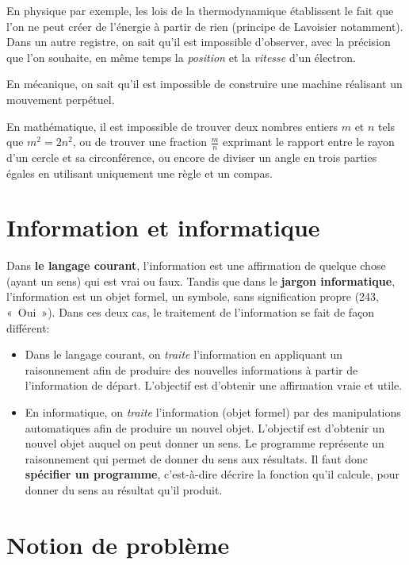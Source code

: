 En physique par exemple, les lois de la thermodynamique établissent le fait que l'on ne peut créer de l'énergie à partir de rien (principe de Lavoisier notamment). Dans un autre registre, on sait qu'il est impossible d'observer, avec la précision que l'on souhaite, en même temps la \textit{position} et la \textit{vitesse} d'un électron.

En mécanique, on sait qu'il est impossible de construire une machine réalisant un mouvement perpétuel.

En mathématique, il est impossible de trouver deux nombres entiers $m$ et $n$ tels que $m^2 = 2n^2$, ou de trouver une fraction $\frac{m}{n}$ exprimant le rapport entre le rayon d'un cercle et sa circonférence, ou encore de diviser un angle en trois parties égales en utilisant uniquement une règle et un compas.

\section{Information et informatique}
\label{sec:information_informatique}

Dans \textbf{le langage courant}, l’information est une affirmation de quelque chose (ayant un sens) qui est vrai ou faux. Tandis que dans le \textbf{jargon informatique}, l’information est un objet formel, un symbole, sans signification propre (243, « Oui »).
Dans ces deux cas, le traitement de l'information se fait de façon différent:
\begin{itemize}
	\item Dans le langage courant, on \textit{traite} l'information en appliquant un raisonnement afin de produire des nouvelles informations à partir de l'information de départ. L'objectif est d'obtenir une affirmation vraie et utile.
	\item En informatique, on \textit{traite} l’information (objet formel) par des manipulations automatiques afin de produire un nouvel objet. L’objectif est d’obtenir un nouvel objet auquel on peut donner un sens. Le programme représente un raisonnement qui permet de donner du sens aux résultats. Il faut donc \textbf{spécifier un programme}, c'est-à-dire décrire la fonction qu’il calcule, pour donner du sens au résultat qu’il produit.
\end{itemize}

\section{Notion de problème}
\label{sec:notion_de_probleme}

